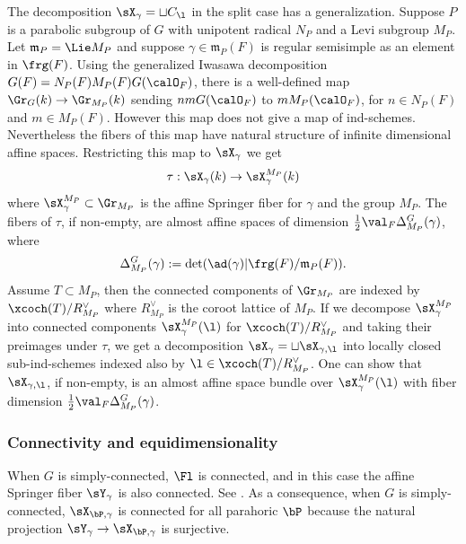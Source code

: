 The decomposition $\sX_{\gamma}=\sqcup C_{\l}$ in the split case has a generalization. Suppose $P$ is a parabolic subgroup of $G$ with unipotent radical $N_{P}$ and a Levi subgroup $M_{P}$.  Let $\mathfrak{m}_{P}=\Lie M_{P}$ and suppose $\gamma\in\mathfrak{m}_{P}(F)$ is regular semisimple as an element in  $\frg(F)$.  Using the generalized Iwasawa decomposition $G(F)=N_{P}(F)M_{P}(F)G(\calO_{F})$, there is a well-defined map $\Gr_{G}(k)\to \Gr_{M_{P}}(k)$ sending $nm G(\calO_{F})$ to $m M_{P}(\calO_{F})$, for $n\in N_{P}(F)$ and $m\in M_{P}(F)$. However this map does not give a map of ind-schemes. Nevertheless the fibers of this map have natural structure of infinite dimensional affine spaces. Restricting this map to $\sX_{\gamma}$ we get
\begin{equation*}
\tau: \sX_{\gamma}(k)\to \sX^{M_{P}}_{\gamma}(k)
\end{equation*}
where $\sX^{M_{P}}_{\gamma}\subset \Gr_{M_{P}}$ is the affine Springer fiber for $\gamma$ and the group $M_{P}$. The fibers of $\tau$, if non-empty, are almost affine spaces of dimension $\frac{1}{2}\val_{F}\Delta^{G}_{M_{P}}(\gamma)$, where
\begin{equation}\label{Delta G L}
\Delta^{G}_{M_{P}}(\gamma):=\det(\ad(\gamma)|\frg(F)/\mathfrak{m}_{P}(F)).
\end{equation}
Assume $T\subset M_{P}$, then the connected components of $\Gr_{M_{P}}$ are indexed by $\xcoch(T)/R^{\vee}_{M_{P}}$ where $R^{\vee}_{M_{P}}$ is the coroot lattice of $M_{P}$. If we decompose $\sX^{M_{P}}_{\gamma}$ into connected components $\sX^{M_{P}}_{\gamma}(\l)$ for $\xcoch(T)/R^{\vee}_{M_{P}}$ and taking their preimages under $\tau$, we get a decomposition $\sX_{\gamma}=\sqcup\sX_{\gamma,\l}$ into locally closed sub-ind-schemes indexed also by $\l\in\xcoch(T)/R^{\vee}_{M_{P}}$. One can show that $\sX_{\gamma,\l}$, if non-empty, is an almost affine space bundle over $\sX^{M_{P}}_{\gamma}(\l)$ with fiber dimension $\frac{1}{2}\val_{F}\Delta^{G}_{M_{P}}(\gamma)$.



\subsubsection{Connectivity and equidimensionality}\label{sss:equidim} When $G$ is simply-connected,  $\Fl$ is connected, and in this case the affine Springer fiber $\sY_{\gamma}$ is also connected. See \cite[\S4, Lemma 2]{KL}. As a consequence, when $G$ is simply-connected,  $\sX_{\bP,\gamma}$ is connected for all parahoric $\bP$ because the natural projection $\sY_{\gamma}\to \sX_{\bP,\gamma}$ is surjective. 

